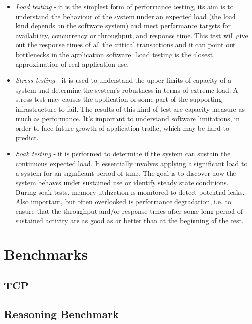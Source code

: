 \begin{itemize}
\item \textit{Load testing} - it is the simplest form of performance testing, its aim is to understand the behaviour of the system under an expected load (the load kind depends on the software system) and meet performance targets for availability, concurrency or throughput, and response time. This test will give out the response times of all the critical transactions and it can point out bottlenecks in the application software. Load testing is the closest approximation of real application use.

\item \textit{Stress testing} -  it is used to understand the upper limits of capacity of a system and determine the system's robustness in terms of extreme load. A stress test may causes the application or some part of the supporting infrastructure to fail. The results of this kind of test are  capacity measure as much as performance. It's important to understand software limitations, in order to face future growth of application traffic, which may be hard to predict.

\item \textit{ Soak testing} - it is performed to determine if the system can sustain the continuous expected load. It essentially involves applying a significant load to a system for an significant period of time. The goal is to discover how the system behaves under sustained use or identify steady state conditions. During soak tests, memory utilization is monitored to detect potential leaks. Also important, but often overlooked is performance degradation, i.e. to ensure that the throughput and/or response times after some long period of sustained activity are as good as or better than at the beginning of the test. 
\end{itemize} 



\section{Benchmarks}
\subsection{TCP}  \label{sec:tcp}


\subsection{Reasoning Benchmark}
